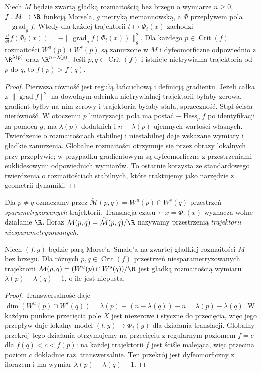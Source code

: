 \begin{lemat}
\label{lem:morse-energy-v10}
Niech $M$ będzie zwartą gładką rozmaitością bez brzegu
o wymiarze $n\ge0$, $f:M\to\R$ funkcją Morse'a,
$g$ metryką riemannowską, a $\Phi$ przepływem
pola $-\operatorname{grad}_g f$. Wtedy dla każdej
trajektorii $t\mapsto\Phi_t(x)$ zachodzi
$\frac{\dd}{\dd t}f(\Phi_t(x))=-\|\operatorname{grad}_g f(\Phi_t(x))\|_g^2$.
Dla każdego $p\in\operatorname{Crit}(f)$ rozmaitości
$W^u(p)$ i $W^s(p)$ są zanurzone w $M$
i dyfeomorficzne odpowiednio z $\R^{\lambda(p)}$ oraz
$\R^{n-\lambda(p)}$. Jeśli $p,q\in\operatorname{Crit}(f)$
i istnieje nietrywialna trajektoria od $p$ do $q$,
to $f(p)>f(q)$.
\end{lemat}
\begin{proof}
Pierwsza równość jest regułą łańcuchową i definicją gradientu.
Jeżeli całka z $\|\operatorname{grad}f\|^2$ na dowolnym odcinku
nietrywialnej trajektorii byłaby zerowa, gradient byłby na nim zerowy
i trajektoria byłaby stała, sprzeczność. Stąd ścisła nierówność.
W otoczeniu $p$ liniaryzacja pola ma postać
$-\operatorname{Hess}_pf$ po identyfikacji za pomocą $g$; ma
$\lambda(p)$ dodatnich i $n-\lambda(p)$ ujemnych wartości własnych.
Twierdzenie o rozmaitościach stabilnej i niestabilnej daje wskazane
wymiary i gładkie zanurzenia. Globalne rozmaitości otrzymuje się
przez obrazy lokalnych przy przepływie; w przypadku gradientowym
są dyfeomorficzne z przestrzeniami euklidesowymi odpowiednich wymiarów.
To ostatnie korzysta ze standardowego twierdzenia o rozmaitościach
stabilnych, które traktujemy jako narzędzie z geometrii dynamiki.
\end{proof}

Dla $p\ne q$ oznaczamy przez
$\widetilde{\mathcal M}(p,q)=W^u(p)\cap W^s(q)$
przestrzeń \emph{sparametryzowanych} trajektorii. Translacja czasu
$\tau\cdot x=\Phi_\tau(x)$ wyznacza wolne działanie $\R$.
Iloraz $\mathcal M(p,q)=\widetilde{\mathcal M}(p,q)/\R$
nazywamy przestrzenią \emph{trajektorii niesparametryzowanych}.

\begin{stwierdzenie}
\label{prop:morse-dimension-v10}
Niech $(f,g)$ będzie parą Morse'a--Smale'a na zwartej
gładkiej rozmaitości $M$ bez brzegu.
Dla różnych $p,q\in\operatorname{Crit}(f)$ przestrzeń
niesparametryzowanych trajektorii
$\mathcal M(p,q)=(W^u(p)\cap W^s(q))/\R$
jest gładką rozmaitością wymiaru
$\lambda(p)-\lambda(q)-1$, o ile jest niepusta.
\end{stwierdzenie}
\begin{proof}
Transwersalność daje
$\dim(W^u(p)\cap W^s(q))=\lambda(p)+(n-\lambda(q))-n
=\lambda(p)-\lambda(q)$.
W każdym punkcie przecięcia pole $X$ jest niezerowe i styczne do
przecięcia, więc jego przepływ daje lokalny model
$(t,y)\mapsto\Phi_t(y)$ dla działania translacji.
Globalny przekrój tego działania otrzymujemy na przecięciu z
regularnym poziomem $f=c$ dla $f(q)<c<f(p)$:
na każdej trajektorii $f$ jest ściśle malejąca, więc przecina
poziom $c$ dokładnie raz, transwersalnie.
Ten przekrój jest dyfeomorficzny z ilorazem i ma wymiar
$\lambda(p)-\lambda(q)-1$.
\end{proof}

